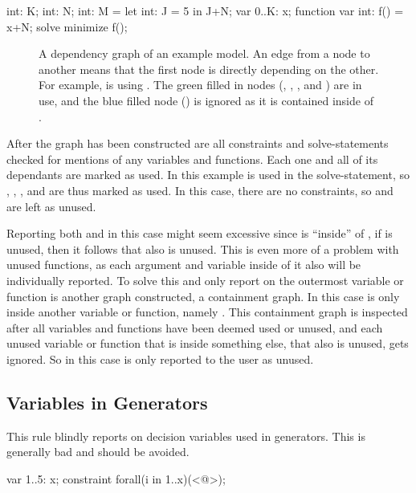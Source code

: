 \documentclass[a4paper,12pt]{article}
\begin{document}
\begin{mznnobreak}
int: K; int: N;
int: M = let {int: J = 5} in J+N;
var 0..K: x;
function var int: f() = x+N;
solve minimize f();
\end{mznnobreak}

\begin{figure}[ht]
  \centering
  \smallskip%
  
  \smallskip%
  \caption{A dependency graph of an example model. An edge from a node to another means
    that the first node is directly depending on the other. For example,  is using
    . The green filled in nodes (, , , and ) are in use, and
    the blue filled node () is ignored as it is contained inside of .}%
  \label{fig:unused:graph}
\end{figure}

After the graph has been constructed are all constraints and solve-statements checked for
mentions of any variables and functions. Each one and all of its
dependants are marked as used. In this example is  used in the solve-statement, so
, , , and  are thus marked as used. In this case, there are no
constraints, so  and  are left as unused.

Reporting both  and  in this case might seem excessive since  is
``inside'' of , if  is unused, then it follows that  also is unused.
This is even more of a problem with unused functions, as each argument and variable inside
of it also will be individually reported. To solve this and only report on the outermost
variable or function is another graph constructed, a containment graph. In this case is
only  inside another variable or function, namely . This containment graph is
inspected after all variables and functions have been deemed used or unused, and each
unused variable or function that is inside something else, that also is unused, gets
ignored. So in this case is only  reported to the user as unused.

\subsection{Variables in Generators}\label{sec:rule:vargen}
This rule blindly reports on decision variables used in generators. This is generally
bad and should be avoided.

\begin{mznnobreak}
var 1..5: x;
constraint forall(i in 1..x)(<@\dots@>);
\end{mznnobreak}
\end{document}
